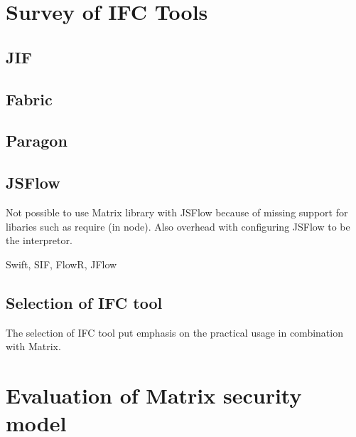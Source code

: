\section{Survey of IFC Tools}

\subsection{JIF}

\subsection{Fabric}

\subsection{Paragon}

\subsection{JSFlow}
Not possible to use Matrix library with JSFlow because of missing support for libaries such as require (in node). Also overhead with configuring JSFlow to be the interpretor.

Swift, SIF, FlowR, JFlow


\subsection{Selection of IFC tool}
The selection of IFC tool put emphasis on the practical usage in combination with Matrix. 

\section{Evaluation of Matrix security model}



